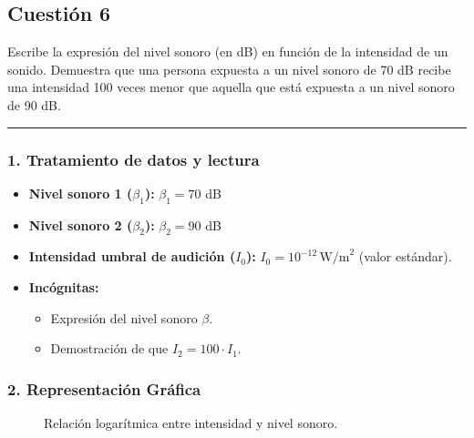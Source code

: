 \newpage

\subsection{Cuestión 6}
\label{subsec:C6_2023_jul_ord}

\begin{cajaenunciado}
Escribe la expresión del nivel sonoro (en dB) en función de la intensidad de un sonido. Demuestra que una persona expuesta a un nivel sonoro de 70 dB recibe una intensidad 100 veces menor que aquella que está expuesta a un nivel sonoro de 90 dB.
\end{cajaenunciado}
\hrule

\subsubsection*{1. Tratamiento de datos y lectura}
\begin{itemize}
    \item \textbf{Nivel sonoro 1 ($\beta_1$):} $\beta_1 = 70$ dB
    \item \textbf{Nivel sonoro 2 ($\beta_2$):} $\beta_2 = 90$ dB
    \item \textbf{Intensidad umbral de audición ($I_0$):} $I_0 = 10^{-12} \, \text{W/m}^2$ (valor estándar).
    \item \textbf{Incógnitas:}
    \begin{itemize}
        \item Expresión del nivel sonoro $\beta$.
        \item Demostración de que $I_2 = 100 \cdot I_1$.
    \end{itemize}
\end{itemize}

\subsubsection*{2. Representación Gráfica}
\begin{figure}[H]
    \centering
    \caption{Relación logarítmica entre intensidad y nivel sonoro.}
\end{figure}

